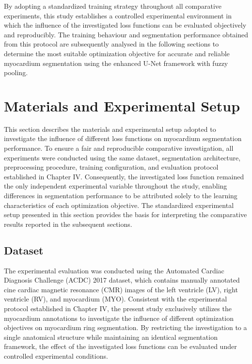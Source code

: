 By adopting a standardized training strategy throughout all comparative experiments, this study establishes a controlled experimental environment in which the influence of the investigated loss functions can be evaluated objectively and reproducibly. The training behaviour and segmentation performance obtained from this protocol are subsequently analysed in the following sections to determine the most suitable optimization objective for accurate and reliable myocardium segmentation using the enhanced U-Net framework with fuzzy pooling. 

\section{Materials and Experimental Setup}
\label{sec:ch5-Experiment-Setup}

This section describes the materials and experimental setup adopted to investigate the influence of different loss functions on myocardium segmentation performance. To ensure a fair and reproducible comparative investigation, all experiments were conducted using the same dataset, segmentation architecture, preprocessing procedure, training configuration, and evaluation protocol established in Chapter IV. Consequently, the investigated loss function remained the only independent experimental variable throughout the study, enabling differences in segmentation performance to be attributed solely to the learning characteristics of each optimization objective. The standardized experimental setup presented in this section provides the basis for interpreting the comparative results reported in the subsequent sections. 

\subsection{Dataset}
\label{subsec:ch5-Dataset}

The experimental evaluation was conducted using the Automated Cardiac Diagnosis Challenge (ACDC) 2017 dataset, which contains manually annotated cine cardiac magnetic resonance (CMR) images of the left ventricle (LV), right ventricle (RV), and myocardium (MYO). Consistent with the experimental protocol established in Chapter IV, the present study exclusively utilizes the myocardium annotations to investigate the influence of different optimization objectives on myocardium ring segmentation. By restricting the investigation to a single anatomical structure while maintaining an identical segmentation framework, the effect of the investigated loss functions can be evaluated under controlled experimental conditions. 

